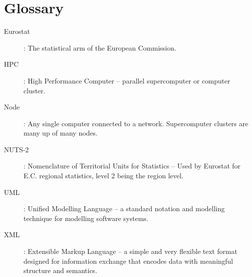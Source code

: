 \documentclass[a4paper,11pt]{article}
\begin{document}
\pagebreak

%
%

%


\pagebreak

\section*{Glossary}
\label{glossary}

\begin{description}
\item[Eurostat]: The statistical arm of the European Commission.
\item[HPC]: High Performance Computer -- parallel supercomputer or computer cluster.
\item[Node]: Any single computer connected to a network. Supercomputer clusters are many up of many nodes.
\item[NUTS-2]: Nomenclature of Territorial Units
for Statistics -- Used by Eurostat for E.C. regional statistics, level 2 being the region level.
\item[UML]: Unified Modelling Language -- a standard notation and modelling technique for modelling software systems.
\item[XML]: Extensible Markup Language -- a simple and very flexible text format designed for information exchange that encodes data with meaningful structure and semantics.
\end{description}
\end{document}

